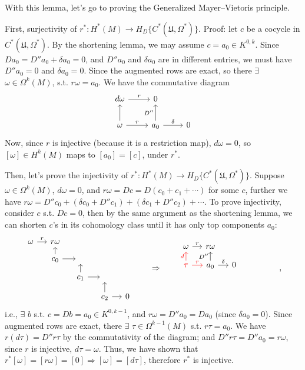 \documentclass{article}
\theoremstyle{mystyle}
\theoremstyle{remark}
\numberwithin{equation}{section}
\begin{document}
With this lemma, let's go to proving the Generalized Mayer--Vietoris principle.

First, surjectivity of $r^*\colon H^*(M)\rightarrow H_D\{C^*(\mathfrak{U},\Omega^*)\}$. Proof: let $c$ be a cocycle in $C^*(\mathfrak{U},\Omega^*)$. By the shortening lemma, we may assume $c =a_0\in K^{0,k}$. Since $Da_0 = D''a_0+\delta a_0=0$, and $D''a_0$ and $\delta a_0$ are in different entries, we must have $D''a_0=0$ and $\delta a_0=0$. Since the augmented rows are exact, so there $\exists$ $\omega \in \Omega^k(M)$, s.t. $r\omega = a_0$.  We have the commutative diagram
$$
\begin{tikzcd}
d\omega \ar[r,"r"] &0 &\\
\omega \ar[r,"r"] \ar[u] &a_0\ar[r,"\delta"] \ar[u,"D''"] &0 
\end{tikzcd}
$$
Now, since $r$ is injective (because it is a restriction map), $d\omega=0$, so $[\omega] \in H^k(M)$ maps to $[a_0]=[c]$, under $r^*$. 

Then, let's prove the injectivity of $r^*\colon H^*(M)\rightarrow H_D\{C^*(\mathfrak{U},\Omega^*)\}$. Suppose $\omega \in \Omega^k(M)$, $d\omega =0$, and $r\omega = Dc = D(c_0+c_1+\cdots)$ for some $c$, further we have $r\omega = D''c_0 +(\delta c_0+D''c_1) + (\delta c_1+D''c_2)+\cdots$. To prove injectivity, consider $c$ s.t. $Dc=0$, then by the same argument as the shortening lemma, we can shorten $c$'s in its cohomology class until it has only top components $a_0$:
$$
\begin{tikzcd}[column sep = small, row sep = small]
\omega \ar[r,"r"] &r\omega&~&~&~\\ &c_0\ar[u]\ar[r]&~&~&~\\ & &c_1\ar[u]\ar[r]&~&~\\
~&~&~&c_2\ar[u]\ar[r]&0
\end{tikzcd}
\qquad
\Rightarrow
\qquad
\begin{tikzcd}[column sep = small, row sep = small]
\omega\ar[r,"r"] &r\omega&~&~\\\textcolor{red}{\tau}\ar[u,red,"d"]\ar[r,red,"r"]& a_0\ar[u,"D''"]\ar[r,"\delta"] &0&~&~\\&~&~&~&~\\&~&~&~&~
\end{tikzcd},
$$
i.e., $\exists$ $b$ s.t. $c=Db=a_0 \in K^{0,k-1}$, and $r\omega = D''a_0 = Da_0$ (since $\delta a_0=0$). Since augmented rows are exact, there $\exists$ $\tau \in \Omega^{k-1}(M)$ s.t. $r\tau = a_0$. We have $r(d\tau) = D''r\tau$ by the commutativity of the diagram; and $D''r\tau = D''a_0 = r\omega$, since $r$ is injective, $d\tau = \omega$. Thus, we have shown that $r^*[\omega] = [r\omega] = [0]\Rightarrow [\omega] = [d\tau]$, therefore $r^*$ is injective. 
\end{document}
